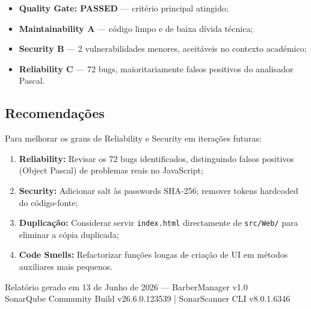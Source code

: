 \documentclass[12pt,a4paper]{article}
\begin{document}
\begin{itemize}
    \item[\textcolor{sonargreen}{\checkmark}] \textbf{Quality Gate: PASSED} — critério principal atingido;
    \item[\textcolor{sonargreen}{\checkmark}] \textbf{Maintainability A} — código limpo e de baixa dívida técnica;
    \item[\textcolor{sonarorange}{$\sim$}] \textbf{Security B} — 2 vulnerabilidades menores, aceitáveis no contexto académico;
    \item[\textcolor{sonarred}{!}] \textbf{Reliability C} — 72 bugs, maioritariamente falsos positivos do analisador Pascal.
\end{itemize}

\subsection{Recomendações}

Para melhorar os graus de Reliability e Security em iterações futuras:

\begin{enumerate}
    \item \textbf{Reliability:} Revisar os 72 bugs identificados, distinguindo falsos positivos (Object Pascal) de problemas reais no JavaScript;
    \item \textbf{Security:} Adicionar salt às passwords SHA-256; remover tokens hardcoded do código-fonte;
    \item \textbf{Duplicação:} Considerar servir \texttt{index.html} directamente de \texttt{src/Web/} para eliminar a cópia duplicada;
    \item \textbf{Code Smells:} Refactorizar funções longas de criação de UI em métodos auxiliares mais pequenos.
\end{enumerate}

\vfill
\begin{center}
    \textcolor{sonargray}{\small Relatório gerado em 13 de Junho de 2026 — BarberManager v1.0}\\
    \textcolor{sonargray}{\small SonarQube Community Build v26.6.0.123539 | SonarScanner CLI v8.0.1.6346}
\end{center}
\end{document}
